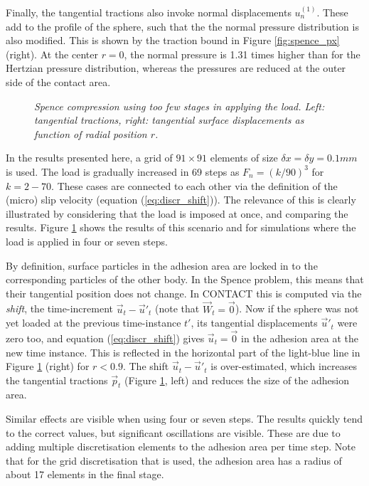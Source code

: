 \documentclass[12pt]{report}
\begin{document}
{Finally, the tangential tractions also invoke normal displacements
$u^{(1)}_n$. These add to the profile of the sphere, such that the
the normal pressure distribution is also modified. This is shown by the
traction bound in Figure \ref{fig:spence_px} (right). At the center $r=0$,
the normal pressure is 1.31 times higher than for the Hertzian pressure
distribution, whereas the pressures are reduced at the outer side of the
contact area.

\begin{figure}[bt]
\centering
{}
\caption{\em Spence compression using too few stages in applying the load.
Left: tangential tractions, right: tangential surface displacements as
function of radial position $r$.}
\label{fig:spence_px_4stps}
\end{figure}

In the results presented here, a grid of $91\times 91$ elements of size
$\delta x=\delta y=0.1\unit{mm}$ is used. The load is gradually increased in 69
steps as $F_n=(k/90)^3$ for $k=2-70$. These cases are connected to each
other via the definition of the (micro) slip velocity (equation
(\ref{eq:discr_shift})). The relevance of this is clearly illustrated by
considering that the load is imposed at once, and comparing the results.
Figure \ref{fig:spence_px_4stps} shows the results of this scenario and for
simulations where the load is applied in four or seven steps.

By definition, surface particles in the adhesion area are locked in to the
corresponding particles of the other body. In the Spence problem, this
means that their tangential position does not change. In CONTACT this is
computed via the {\em shift\/}, the time-increment $\vec{u}_t -\vec{u}'_t$
(note that $\vec{W}_t=\vec{0}$). Now if the sphere was not yet loaded at
the previous time-instance $t'$, its tangential displacements $\vec{u}'_t$
were zero too, and equation (\ref{eq:discr_shift}) gives
$\vec{u}_t=\vec{0}$ in the adhesion area at the new time instance. This is
reflected in the horizontal part of the light-blue line in Figure
\ref{fig:spence_px_4stps} (right) for $r<0.9$. The shift
$\vec{u}_t-\vec{u}'_t$ is over-estimated, which increases the tangential
tractions $\vec{p}_t$ (Figure \ref{fig:spence_px_4stps}, left) and reduces
the size of the adhesion area.

Similar effects are visible when using four or seven steps. The results
quickly tend to the correct values, but significant oscillations are
visible. These are due to adding multiple discretisation elements to the
adhesion area per time step. Note that for the grid discretisation that is
used, the adhesion area has a radius of about 17 elements in the final stage.
}
\end{document}
